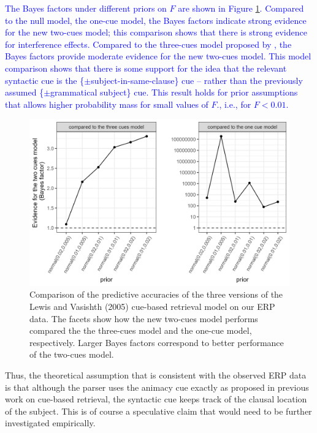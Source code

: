 \documentclass[a4paper, man, floatsintext]{apa7}
\begin{document}
{{\textcolor{blue}{The Bayes factors under different priors on $F$ are shown in Figure \ref{fig:BF_compmods}. Compared to the null model, the one-cue model, the Bayes factors indicate strong evidence for the new two-cues model; this comparison shows that there is strong evidence for interference effects. Compared to the three-cues model proposed by \textcite{mertzen}, the Bayes factors provide moderate evidence for the new two-cues model. This model comparison shows that there is some support for the idea that the relevant syntactic cue is the \{$\pm$subject-in-same-clause\} cue – rather than the previously assumed \{$\pm$grammatical subject\} cue. This result holds for prior assumptions that allows higher probability mass for small values of $F$., i.e., for $F<0.01$.}

\begin{figure}
    \centering
    \caption{Comparison of the predictive accuracies of the three versions of the Lewis and Vasishth (2005) cue-based retrieval model on our ERP data. The facets show how the new two-cues model performs compared the the three-cues model and the one-cue model, respectively. Larger Bayes factors correspond to better performance of the two-cues model.}
    \label{fig:BF_compmods}
    \includegraphics[width=\linewidth]{images/BF_plot_compmodels.png}
\end{figure}

Thus, the theoretical assumption that is consistent with the observed ERP data is that although the parser uses the animacy cue exactly as proposed in previous work on cue-based retrieval, the syntactic cue keeps track of the clausal location of the subject. This is of course a speculative claim that would need to be further investigated empirically. 

}}
\end{document}
